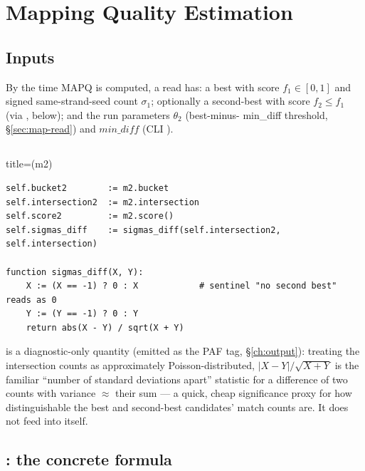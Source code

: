 \chapter{Mapping Quality Estimation}
\label{ch:mapq}

\section{Inputs}

By the time MAPQ is computed, a read has: a best  with score $f_1 \in [0,1]$ and
signed same-strand-seed count $\sigma_1$; optionally a second-best  with score
$f_2 \le f_1$ (via , below); and the run parameters $\theta_2$ (best-minus-
min\_diff threshold, \S\ref{sec:map-read}) and $\mathit{min\_diff}$ (CLI ).

\section{}

\begin{algobox}{title={(m2)}}
\begin{verbatim}
self.bucket2        := m2.bucket
self.intersection2  := m2.intersection
self.score2         := m2.score()
self.sigmas_diff    := sigmas_diff(self.intersection2, self.intersection)

function sigmas_diff(X, Y):
    X := (X == -1) ? 0 : X            # sentinel "no second best" reads as 0
    Y := (Y == -1) ? 0 : Y
    return abs(X - Y) / sqrt(X + Y)
\end{verbatim}
\end{algobox}

 is a diagnostic-only quantity (emitted as the  PAF tag,
\S\ref{ch:output}): treating the intersection counts as approximately Poisson-distributed, $|X-Y|
/\sqrt{X+Y}$ is the familiar ``number of standard deviations apart'' statistic for a difference of
two counts with variance $\approx$ their sum --- a quick, cheap significance proxy for how
distinguishable the best and second-best candidates' match counts are. It does not feed into
 itself.

\section{: the concrete formula}
\label{sec:calc-mapq-formula}

